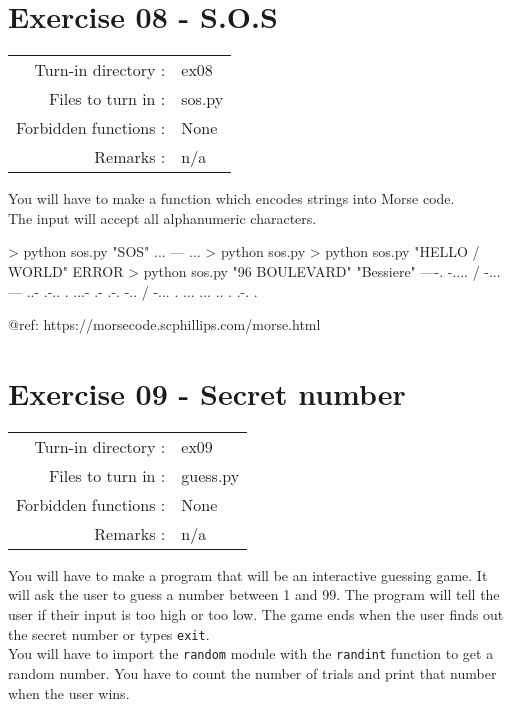 \documentclass[]{article}
\newenvironment{Shaded}{\begin{snugshade}}{\end{snugshade}}
\newcommand{\NormalTok}[1]{\textcolor[rgb]{0.81,0.81,0.76}{#1}}
\begin{document}
\clearpage

\hypertarget{exercise-08---s.o.s-1}{%
\section{Exercise 08 - S.O.S}\label{exercise-08---s.o.s-1}}

\begin{longtable}[]{@{}rl@{}}
\toprule
\endhead
Turn-in directory : & ex08\tabularnewline
Files to turn in : & sos.py\tabularnewline
Forbidden functions : & None\tabularnewline
Remarks : & n/a\tabularnewline
\bottomrule
\end{longtable}

You will have to make a function which encodes strings into Morse
code.\\
The input will accept all alphanumeric characters.

\begin{Shaded}
\begin{Highlighting}[]
\NormalTok{> python sos.py "SOS"}
\NormalTok{... --- ...}
\NormalTok{> python sos.py}
\NormalTok{> python sos.py "HELLO / WORLD"}
\NormalTok{ERROR}
\NormalTok{> python sos.py "96 BOULEVARD" "Bessiere"}
\NormalTok{----. -.... / -... --- ..- .-.. . ...- .- .-. -.. / -... . ... ... .. . .-. .}
\end{Highlighting}
\end{Shaded}

@ref: https://morsecode.scphillips.com/morse.html

\clearpage

\hypertarget{exercise-09---secret-number-1}{%
\section{Exercise 09 - Secret
number}\label{exercise-09---secret-number-1}}

\begin{longtable}[]{@{}rl@{}}
\toprule
\endhead
Turn-in directory : & ex09\tabularnewline
Files to turn in : & guess.py\tabularnewline
Forbidden functions : & None\tabularnewline
Remarks : & n/a\tabularnewline
\bottomrule
\end{longtable}

You will have to make a program that will be an interactive guessing
game. It will ask the user to guess a number between 1 and 99. The
program will tell the user if their input is too high or too low. The
game ends when the user finds out the secret number or types
\texttt{exit}.\\
You will have to import the \texttt{random} module with the
\texttt{randint} function to get a random number. You have to count the
number of trials and print that number when the user wins.
\end{document}
